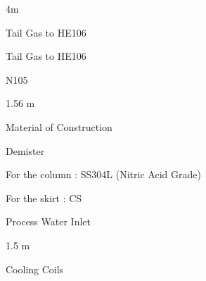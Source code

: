 \documentclass[a4paper,portrait,12pt]{article}
\begin{document}
\begin{flushleft}
\newpage
4m
\end{flushleft}


\begin{flushleft}
Tail Gas to HE106
\end{flushleft}





\begin{flushleft}
Tail Gas to HE106
\end{flushleft}


\begin{flushleft}
N105
\end{flushleft}





\begin{flushleft}
1.56 m
\end{flushleft}





\begin{flushleft}
Material of Construction
\end{flushleft}





\begin{flushleft}
Demister
\end{flushleft}





\begin{flushleft}
For the column : SS304L (Nitric Acid Grade)
\end{flushleft}


\begin{flushleft}
For the skirt : CS
\end{flushleft}





\begin{flushleft}
Process Water Inlet
\end{flushleft}





\begin{flushleft}
1.5 m
\end{flushleft}





\begin{flushleft}
Cooling Coils
\end{flushleft}
\end{document}

